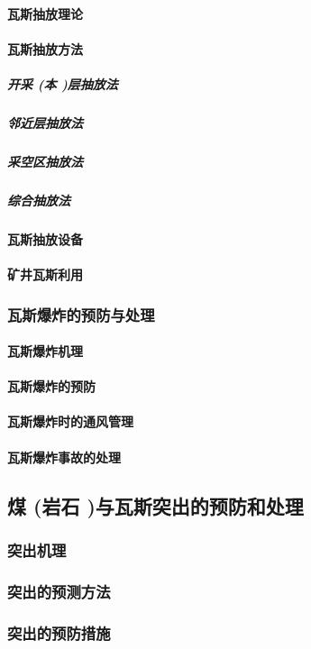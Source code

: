 \documentclass[UTF8]{../../ApplicationUniverse}
\begin{document}
            \paragraph{瓦斯抽放理论}
            \paragraph{瓦斯抽放方法}
                \subparagraph{开采 (本 )层抽放法}
                \subparagraph{邻近层抽放法}
                \subparagraph{采空区抽放法}
                \subparagraph{综合抽放法}
            \paragraph{瓦斯抽放设备}
            \paragraph{矿井瓦斯利用}
        \subsubsection{瓦斯爆炸的预防与处理}
            \paragraph{瓦斯爆炸机理}
            \paragraph{瓦斯爆炸的预防}
            \paragraph{瓦斯爆炸时的通风管理}
            \paragraph{瓦斯爆炸事故的处理}
    \subsection{煤 (岩石 )与瓦斯突出的预防和处理}
        \subsubsection{突出机理}
        \subsubsection{突出的预测方法}
        \subsubsection{突出的预防措施}
\end{document}
